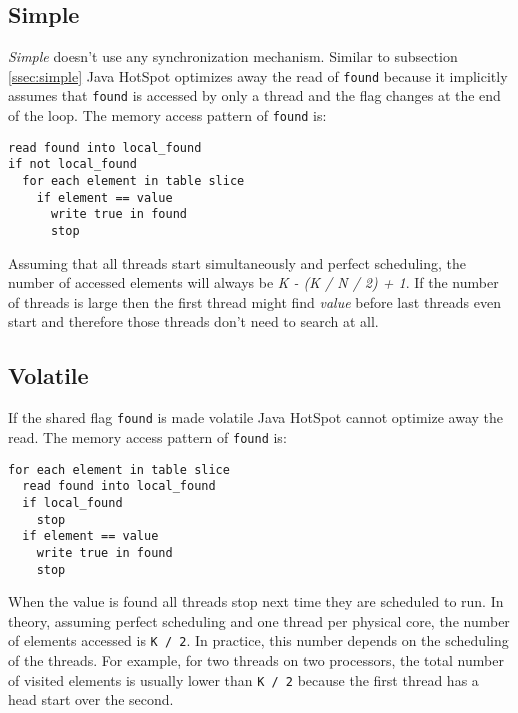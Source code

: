 \documentclass[12pt]{article}
\begin{document}
\subsection{Simple}

\emph{Simple} doesn't use any synchronization mechanism. Similar to
subsection \ref{ssec:simple} Java HotSpot optimizes away the
read of \texttt{found} because it implicitly assumes that \texttt{found}
is accessed by only a thread and the flag changes at the end of
the loop. The memory access pattern of \texttt{found} is:

\begin{verbatim}
read found into local_found
if not local_found
  for each element in table slice
    if element == value
      write true in found 
      stop
\end{verbatim}

Assuming that all threads start simultaneously and perfect scheduling, the
number of accessed elements will always be \emph{K - (K / N / 2) + 1}. If
the number of threads is large then the first thread might find \emph{value}
before last threads even start and therefore those threads don't need to
search at all.

\subsection{Volatile}

If the shared flag \texttt{found} is made volatile Java HotSpot cannot
optimize away the read. The memory access pattern of \texttt{found} is:

\begin{verbatim}
for each element in table slice
  read found into local_found
  if local_found
    stop
  if element == value
    write true in found 
    stop
\end{verbatim}

When the value is found all threads stop next time they are scheduled
to run. In theory, assuming perfect scheduling and one thread per physical core,
the number of elements accessed is \texttt{K / 2}. In practice, this number
depends on the scheduling of the threads. For example, for two threads on
two processors, the total number of visited elements is usually lower than
\texttt{K / 2} because the first thread has a head start over the second.
\end{document}

